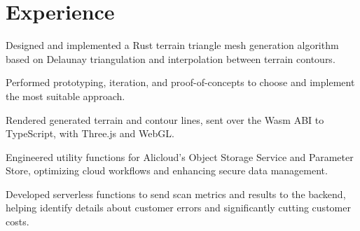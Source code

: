 \section{Experience}

\begin{resumeItem}
\begin{resumeList}
    \item Designed and implemented a Rust terrain triangle mesh generation algorithm based on Delaunay triangulation and interpolation between terrain contours.
    \item Performed prototyping, iteration, and proof-of-concepts to choose and implement the most suitable approach.
    \item Rendered generated terrain and contour lines, sent over the Wasm ABI to TypeScript, with Three.js and WebGL.
\end{resumeList}
\end{resumeItem}

\begin{resumeItem}
\begin{resumeList}
    \item Engineered utility functions for Alicloud's Object Storage Service and Parameter Store, optimizing cloud workflows and enhancing secure data management.
    \item Developed serverless functions to send scan metrics and results to the backend, helping identify details about customer errors and significantly cutting customer costs.
\end{resumeList}
\end{resumeItem}

